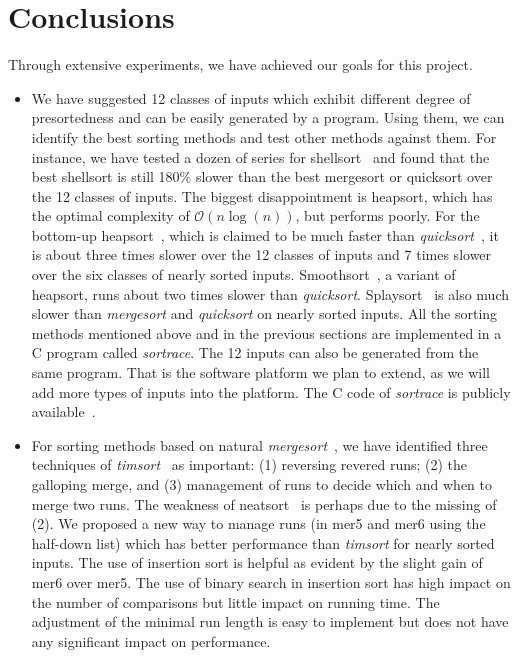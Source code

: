 \documentclass[AMA,STIX1COL]{WileyNJD-v2}
\newcommand{\qusort}{\emph{quicksort }}
\newcommand{\qusortn}{\emph{quicksort}}
\newcommand{\tsort}{\emph{timsort }}
\newcommand{\tsortn}{\emph{timsort}}
\newcommand{\msort}{\emph{mergesort }}
\newcommand{\msortn}{\emph{mergesort}}
\begin{document}
\section{Conclusions}
Through extensive experiments, we have achieved our goals for this project. 
\begin{itemize}
\item We have suggested 12 classes of inputs which exhibit different degree of presortedness and can be easily generated by a program. 
Using them, we can identify the best sorting methods and test other methods against them. 
For instance, we have tested a dozen of series for shellsort~\cite{knuth97} and found that the best shellsort is still 180\% slower than the best mergesort or quicksort over the 12 classes of inputs. 
The biggest disappointment is heapsort, which has the optimal complexity of $\mathcal{O}(n\log(n))$, but performs poorly. 
For the bottom-up heapsort~\cite{williams1964algorithm}, which is claimed to be much faster than \qusortn~\cite{wegener1993bottom}, it is about three times slower over the 12 classes of inputs and 7 times slower over the six classes of nearly sorted inputs. 
Smoothsort~\cite{dijkstra1982smoothsort}, a variant of heapsort, runs about two times slower than \qusortn. 
Splaysort~\cite{moffat1996splaysort} is also much slower than \msort and \qusort on nearly sorted inputs. 
All the sorting methods  mentioned above and in the previous sections are implemented in a C program called \textit{sortrace}. 
The 12 inputs can also be generated from the same program. 
That is the software platform we plan to extend, as we will add more types of inputs into the platform. 
The C code of \textit{sortrace} is publicly available~\cite{sortracecode}.
\item For sorting methods based on natural \msortn~\cite{mcilroy1993optimistic}, we have identified three techniques of \tsortn~\cite{timsort} as important: (1) reversing revered runs; (2) the galloping merge, and (3) management of runs to decide which and when to merge two runs. 
The weakness of neatsort~\cite{la2014neatsort} is perhaps due to the missing of (2). 
We proposed a new way to manage runs (in mer5 and mer6 using the half-down list) which has better performance than \tsort for nearly sorted inputs. 
The use of insertion sort is helpful as evident by the slight gain of mer6 over mer5. 
The use of binary search in insertion sort has high impact on the number of comparisons but little impact on running time. 
The adjustment of the minimal run length is easy to implement but does not have any significant impact on performance.

\end{itemize}
\end{document}
